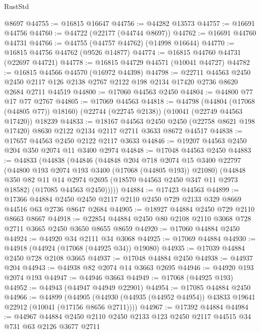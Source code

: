 \begin{lexlean}{RustStd}
\begin{coremodule}
    @8697
@44755 := @16815 @16647
@44756 := @44282 @13573
@44757 := @16691 @44756
@44760 := @44722 (@22177 (@44744 @8697))
@44762 := @16691 @44760 @44731
@44766 := @44755 (@44757 @44762) (@14998 @16644)
@44770 := @16815 @44756 @44762 (@9526 @14877)
@44774 := @16815 @44760 @44731 (@22697 @44721)
@44778 := @16815 @44729 @44571 (@10041 @44727)
@44782 := @16815 @44566 @44570 (@16972 @44398)
@44798 := @22711
    @44563
    @2450
    @2450
    @2117
    @126
    @2138
    @2767
    @2122
    @198
    @2134
    @17420
    @2736
    @8620
    @2684
    @2711
    @44519
@44800 := @17060 @44563 @2450
@44804 := @44800 @77 @17 @77 @2767
@44805 := @17069 @44563
@44818 := @44798
    (@44804 (@17068 (@44805 @77)) @18160)
    (@22744 (@22745 @2138))
    (@10041 (@22749 @44563 @17420))
    @18239
@44833 := @18167
    @44563
    @2450
    @2450
    (@22758 @8621 @198 @17420)
    @8630
    @2122
    @2134
    @2117
    @2711
    @3633
    @8672
    @44517
@44838 := @17657 @44563 @2450 @2122 @2117 @3633
@44846 := @19207 @44563 @2450 @204 @350 @2074 @11 @3400 @2974
@44848 := @17048 @44563 @2450
@44883 := @44833
    (@44838
      (@44846
        (@44848
          @204
          @718
          @2074
          @15
          @3400
          @22797
          (@44800 @193 @2074 @193 @3400 (@17068 (@44805 @193)) @21080)
          (@44848
            @350
            @82
            @11
            @14
            @2974
            @2695
            (@18570 @44563 @2450 @347 @11 @2973 @18582)
            (@17085 @44563 @2450)))))
@44884 := @17423 @44563
@44899 := @17366
    @44884
    @2450
    @2450
    @2117
    @2110
    @2450
    @729
    @2133
    @329
    @8669
    @44516
    @63
    @2736
    @8647
    @2684
@44905 := @18927 @44884 @2450 @729 @2110 @8663 @8667
@44918 := @22854 @44884 @2450 @80 @2108 @2110 @3068 @728 @2711 @3665 @2450 @3650 @8655 @8659
@44920 := @17060 @44884 @2450
@44924 := @44920 @34 @2111 @34 @3068
@44925 := @17069 @44884
@44930 := @44918 (@44924 (@17068 (@44925 @34)) @19080)
@44935 := @17039 @44884 @2450 @728 @2108 @3665
@44937 := @17048 @44884 @2450
@44938 := @44937 @204
@44943 := @44938 @82 @2074 @14 @3663 @2695
@44946 := @44920 @193 @2074 @193
@44947 := @44946 @3663
@44949 := @17068 (@44925 @193)
@44952 := @44943 (@44947 @44949 @22901)
@44954 := @17085 @44884 @2450
@44966 := @44899
    (@44905 (@44930 (@44935 (@44952 @44954)) @43833 @19641 @22912 (@10041 (@17156 @8656 @2711))))
@44967 := @17392 @44884
@44984 := @44967
    @44884
    @2450
    @2110
    @2450
    @2133
    @123
    @2450
    @2117
    @44515
    @34
    @731
    @63
    @2126
    @3677
    @2711

\end{coremodule}
\end{lexlean}

